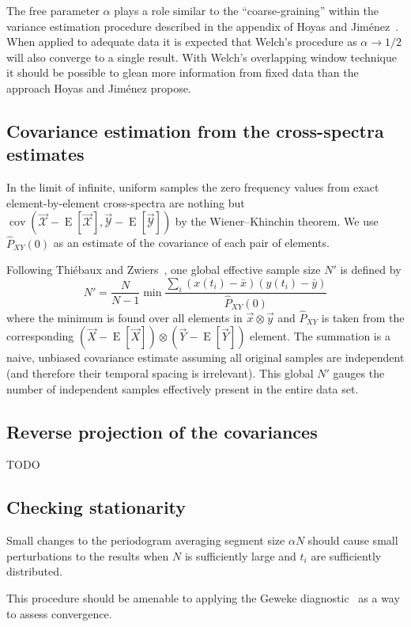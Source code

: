 \documentclass[letterpaper,11pt,nointlimits,reqno]{amsart}
\DeclareMathOperator{\cov}{cov}
\begin{document}
The free parameter $\alpha$ plays a role similar to the ``coarse-graining''
within the variance estimation procedure described in the appendix of Hoyas and
Jim\'{e}nez~\cite{Hoyas2008Reynolds}.  When applied to adequate data it is
expected that Welch's procedure as $\alpha\to{}1/2$ will also converge to a
single result.  With Welch's overlapping window technique it should be possible
to glean more information from fixed data than the approach Hoyas and
Jim\'{e}nez propose.

\subsection*{Covariance estimation from the cross-spectra estimates}

In the limit of infinite, uniform samples the zero frequency values from exact
element-by-element cross-spectra are nothing but $\cov\left( \vec{\mathscr{X}}
- \operatorname{E}\left[\vec{\mathscr{X}}\right], \vec{\mathscr{Y}} -
\operatorname{E}\left[\vec{\mathscr{Y}}\right] \right)$ by the Wiener--Khinchin
theorem.  We use $\hat{P}_{XY}(0)$ as an estimate of the covariance of each
pair of elements.

Following Thi\'{e}baux and Zwiers~\cite{Thiebaux1984Interpretation},
one global effective sample size $N'$ is defined by
$$
    N' = \frac{N}{N-1} \min
    \frac{\sum_i \left(x(t_i) - \bar{x}\right)\left(y(t_i) - \bar{y}\right)}
         {\hat{P}_{XY}(0)}
$$
where the minimum is found over all elements in $\vec{x}\otimes\vec{y}$ and
$\hat{P}_{XY}$ is taken from the corresponding $\left(\vec{X} -
\operatorname{E}\left[\vec{X}\right]\right) \otimes \left(\vec{Y} -
\operatorname{E}\left[\vec{Y}\right]\right)$ element.  The summation is a
naive, unbiased covariance estimate assuming all original samples are
independent (and therefore their temporal spacing is irrelevant).  This global
$N'$ gauges the number of independent samples effectively present in the entire
data set.

\subsection*{Reverse projection of the covariances}

TODO

\subsection*{Checking stationarity}

Small changes to the periodogram averaging segment size $\alpha N$
should cause small perturbations to the results when $N$ is sufficiently
large and $t_i$ are sufficiently distributed.

This procedure should be amenable to applying the Geweke
diagnostic~\cite{Geweke1992Evaluating} as a way to assess convergence.




\end{document}
